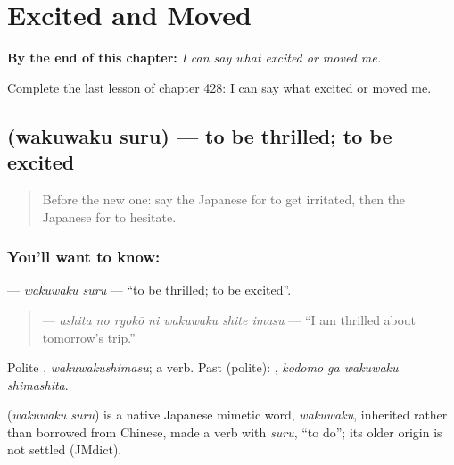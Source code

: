 
\chapter{Excited and Moved}
\label{ch:ja-excited-and-moved}

\begin{chapteropening}
\textbf{By the end of this chapter:} \emph{I can say what excited or moved me.}

Complete the last lesson of chapter 428: I can say what excited or moved me.
\end{chapteropening}

\section[\texorpdfstring{\ja{わくわくする} (wakuwaku suru)}{わくわくする (wakuwaku suru)}]{ (wakuwaku suru) — to be thrilled; to be excited}

\label{lesson:JA-C428-wakuwaku-suru}



\begin{quote}
Before the new one: say the Japanese for to get irritated, then the Japanese for to hesitate.
\end{quote}

\subsection*{You'll want to know: }
\textbf{} — \emph{wakuwaku suru} — \textquotedblleft{}to be thrilled; to be excited\textquotedblright{}.

\begin{quote}
\textbf{  } — \emph{ashita no ryokō ni wakuwaku shite imasu} — \textquotedblleft{}I am thrilled about tomorrow's trip.\textquotedblright{}
\end{quote}

Polite \textbf{}, \emph{wakuwakushimasu}; a  verb. Past (polite): \textbf{ }, \emph{kodomo ga wakuwaku shimashita}.

\begin{cousinweb}
\textbf{} (\emph{wakuwaku suru}) is a native Japanese mimetic word, \emph{wakuwaku}, inherited rather than borrowed from Chinese, made a verb with \emph{suru}, \textquotedblleft{}to do\textquotedblright{}; its older origin is not settled (JMdict).
\end{cousinweb}

